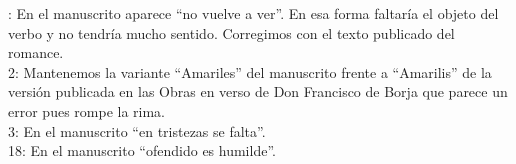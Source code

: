 : En el manuscrito aparece ``no vuelve a ver''. En esa forma faltaría
el objeto del verbo y no tendría mucho sentido. Corregimos con el texto
publicado del romance.\\
2: Mantenemos la variante ``Amariles'' del manuscrito frente a
``Amarilis'' de la versión publicada en las Obras en verso de Don
Francisco de Borja que parece un error pues rompe la rima.\\
3: En el manuscrito ``en tristezas se falta''.\\
18: En el manuscrito ``ofendido es humilde''.
